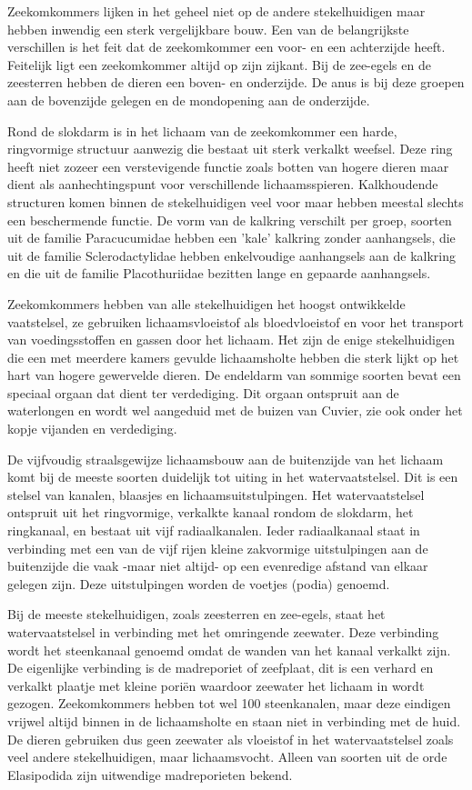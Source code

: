 Zeekomkommers lijken in het geheel niet op de andere stekelhuidigen maar hebben inwendig een sterk vergelijkbare bouw.
Een van de belangrijkste verschillen is het feit dat de zeekomkommer een voor- en een achterzijde heeft.
Feitelijk ligt een zeekomkommer altijd op zijn zijkant.
Bij de zee-egels en de zeesterren hebben de dieren een boven- en onderzijde.
De anus is bij deze groepen aan de bovenzijde gelegen en de mondopening aan de onderzijde.

Rond de slokdarm is in het lichaam van de zeekomkommer een harde, ringvormige structuur aanwezig die bestaat uit sterk verkalkt weefsel.
Deze ring heeft niet zozeer een verstevigende functie zoals botten van hogere dieren maar dient als aanhechtingspunt voor verschillende lichaamsspieren.
Kalkhoudende structuren komen binnen de stekelhuidigen veel voor maar hebben meestal slechts een beschermende functie.
De vorm van de kalkring verschilt per groep, soorten uit de familie Paracucumidae hebben een 'kale' kalkring zonder aanhangsels, die uit de familie Sclerodactylidae hebben enkelvoudige aanhangsels aan de kalkring en die uit de familie Placothuriidae bezitten lange en gepaarde aanhangsels.

Zeekomkommers hebben van alle stekelhuidigen het hoogst ontwikkelde vaatstelsel, ze gebruiken lichaamsvloeistof als bloedvloeistof en voor het transport van voedingsstoffen en gassen door het lichaam.
Het zijn de enige stekelhuidigen die een met meerdere kamers gevulde lichaamsholte hebben die sterk lijkt op het hart van hogere gewervelde dieren.
De endeldarm van sommige soorten bevat een speciaal orgaan dat dient ter verdediging.
Dit orgaan ontspruit aan de waterlongen en wordt wel aangeduid met de buizen van Cuvier, zie ook onder het kopje vijanden en verdediging.

De vijfvoudig straalsgewijze lichaamsbouw aan de buitenzijde van het lichaam komt bij de meeste soorten duidelijk tot uiting in het watervaatstelsel.
Dit is een stelsel van kanalen, blaasjes en lichaamsuitstulpingen.
Het watervaatstelsel ontspruit uit het ringvormige, verkalkte kanaal rondom de slokdarm, het ringkanaal, en bestaat uit vijf radiaalkanalen.
Ieder radiaalkanaal staat in verbinding met een van de vijf rijen kleine zakvormige uitstulpingen aan de buitenzijde die vaak -maar niet altijd- op een evenredige afstand van elkaar gelegen zijn.
Deze uitstulpingen worden de voetjes (podia) genoemd.

Bij de meeste stekelhuidigen, zoals zeesterren en zee-egels, staat het watervaatstelsel in verbinding met het omringende zeewater.
Deze verbinding wordt het steenkanaal genoemd omdat de wanden van het kanaal verkalkt zijn.
De eigenlijke verbinding is de madreporiet of zeefplaat, dit is een verhard en verkalkt plaatje met kleine poriën waardoor zeewater het lichaam in wordt gezogen.
Zeekomkommers hebben tot wel 100 steenkanalen, maar deze eindigen vrijwel altijd binnen in de lichaamsholte en staan niet in verbinding met de huid.
De dieren gebruiken dus geen zeewater als vloeistof in het watervaatstelsel zoals veel andere stekelhuidigen, maar lichaamsvocht.
Alleen van soorten uit de orde Elasipodida zijn uitwendige madreporieten bekend.

